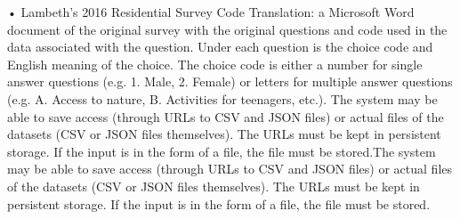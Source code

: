 •	Lambeth’s 2016 Residential Survey Code Translation: a Microsoft Word document of the original survey with the original questions and code used in the data associated with the question. Under each question is the choice code and English meaning of the choice. The choice code is either a number for single answer questions (e.g. 1. Male, 2. Female) or letters for multiple answer questions (e.g. A. Access to nature, B. Activities for teenagers, etc.).
The system may be able to save access (through URLs to CSV and JSON files) or actual files of the datasets (CSV or JSON files themselves). The URLs must be kept in persistent storage. If the input is in the form of a file, the file must be stored.The system may be able to save access (through URLs to CSV and JSON files) or actual files of the datasets (CSV or JSON files themselves). The URLs must be kept in persistent storage. If the input is in the form of a file, the file must be stored.\textquotesingle\textquotesingle\textquotesingle